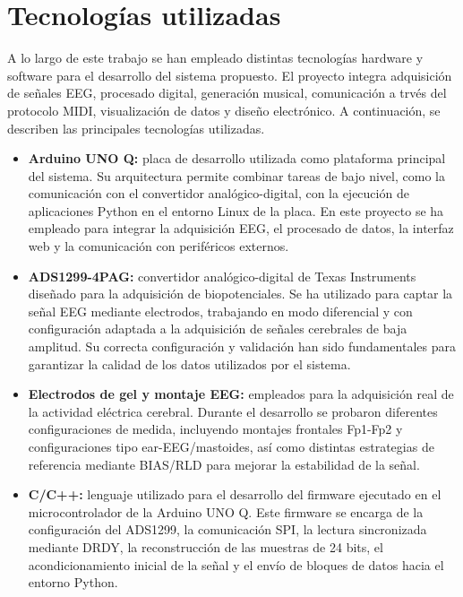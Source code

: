 \documentclass[../main.tex]{subfiles}
\begin{document}
\section{Tecnologías utilizadas}

A lo largo de este trabajo se han empleado distintas tecnologías hardware y software para el desarrollo del sistema propuesto. El proyecto integra adquisición de señales EEG, procesado digital, generación musical, comunicación  a trvés del protocolo MIDI, visualización de datos y diseño electrónico. A continuación, se describen las principales tecnologías utilizadas.

\begin{itemize}

    \item \textbf{Arduino UNO Q:} placa de desarrollo utilizada como plataforma principal del sistema. Su arquitectura permite combinar tareas de bajo nivel, como la comunicación con el convertidor analógico-digital, con la ejecución de aplicaciones Python en el entorno Linux de la placa. En este proyecto se ha empleado para integrar la adquisición EEG, el procesado de datos, la interfaz web y la comunicación con periféricos externos.

    \item \textbf{ADS1299-4PAG:} convertidor analógico-digital de Texas Instruments diseñado para la adquisición de biopotenciales. Se ha utilizado para captar la señal EEG mediante electrodos, trabajando en modo diferencial y con configuración adaptada a la adquisición de señales cerebrales de baja amplitud. Su correcta configuración y validación han sido fundamentales para garantizar la calidad de los datos utilizados por el sistema.

    \item \textbf{Electrodos de gel y montaje EEG:} empleados para la adquisición real de la actividad eléctrica cerebral. Durante el desarrollo se probaron diferentes configuraciones de medida, incluyendo montajes frontales Fp1-Fp2 y configuraciones tipo ear-EEG/mastoides, así como distintas estrategias de referencia mediante BIAS/RLD para mejorar la estabilidad de la señal.

    \item \textbf{C/C++:} lenguaje utilizado para el desarrollo del firmware ejecutado en el microcontrolador de la Arduino UNO Q. Este firmware se encarga de la configuración del ADS1299, la comunicación SPI, la lectura sincronizada mediante DRDY, la reconstrucción de las muestras de 24 bits, el acondicionamiento inicial de la señal y el envío de bloques de datos hacia el entorno Python.


\end{itemize}
\end{document}
